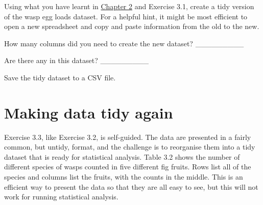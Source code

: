 \documentclass[
  openany]{krantz}
\begin{document}
Using what you have learnt in \protect\hyperlink{Chapter_2}{Chapter 2} and Exercise 3.1, create a tidy version of the wasp egg loads dataset.
For a helpful hint, it might be most efficient to open a new spreadsheet and copy and paste information from the old to the new.

How many columns did you need to create the new dataset? \_\_\_\_\_\_\_\_\_

Are there any  in this dataset? \_\_\_\_\_\_\_\_\_

Save the tidy dataset to a CSV file.

\hypertarget{making-data-tidy-again}{%
\section{Making data tidy again}\label{making-data-tidy-again}}

Exercise 3.3, like Exercise 3.2, is self-guided.
The data are presented in a fairly common, but untidy, format, and the challenge is to reorganise them into a tidy dataset that is ready for statistical analysis.
Table 3.2 shows the number of different species of wasps counted in five different fig fruits.
Rows list all of the species and columns list the fruits, with the counts in the middle.
This is an efficient way to present the data so that they are all easy to see, but this will not work for running statistical analysis.
\end{document}
